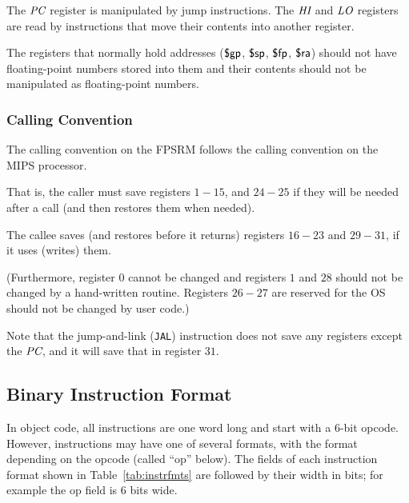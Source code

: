 \documentclass[11pt,letterpaper]{article}
\newcommand{\tabref}[1]{Table~\ref{#1}}  %
\begin{document}
The $\textit{PC}$ register is manipulated by jump instructions.
The $\textit{HI}$ and $\textit{LO}$ registers are read by instructions that move their
contents into another register.

The registers that normally hold addresses ($\textsf{\$gp}$, $\textsf{\$sp}$, $\textsf{\$fp}$,
$\textsf{\$ra}$) should not have floating-point numbers stored into them and
their contents should not be manipulated as floating-point numbers.

\subsubsection{Calling Convention}

The calling convention on the FPSRM follows the calling convention on
the MIPS processor.

That is, the caller must save registers $1-15$, and $24-25$
if they will be needed after a call (and then restores them when
needed).

The callee saves (and restores before it returns) registers $16-23$
and $29-31$, if it uses (writes) them.

(Furthermore, register $0$ cannot be changed and registers $1$ and
$28$ should not be changed by a hand-written routine.
Registers $26-27$ are reserved for the OS should not be changed by user code.)

Note that the jump-and-link (\texttt{JAL}) instruction
does not save any registers except the $\textit{PC}$,
and it will save that in register $31$.

\subsection{Binary Instruction Format}

In object code,
all instructions are one word long and start with a 6-bit opcode.
However, instructions may have one of several formats, with the format
depending on the opcode (called ``op'' below).
The fields of each instruction format shown in \tabref{tab:instrfmts}
are followed by their width in bits;
for example the op field is 6 bits wide.
\end{document}
